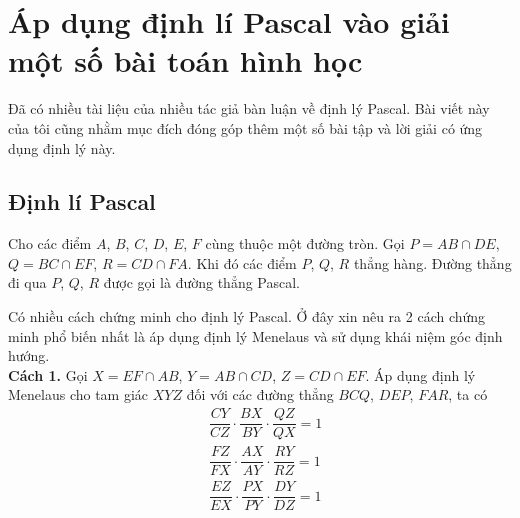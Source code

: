 \section{Áp dụng định lí Pascal vào giải một số bài toán hình học}
\begin{center}
	\textbf{\color{violet}{Ngô Lan Hương - Trường THPT Chuyên Thái Nguyên}}
\end{center}
\noindent Đã có nhiều tài liệu của nhiều tác giả bàn luận về định lý Pascal. Bài viết này của tôi cũng nhằm mục đích đóng góp thêm một số bài tập và lời giải có ứng dụng định lý này.  

\subsection{Định lí Pascal}	

\begin{dl}
Cho các điểm $A$, $B$, $C$, $D$, $E$, $F$ cùng thuộc một đường tròn. Gọi $P=AB\cap DE$, $Q=BC\cap EF$, $R=CD\cap FA$. Khi đó các điểm $P$, $Q$, $R$ thẳng hàng.
Đường thẳng đi qua $P$, $Q$, $R$ được gọi là đường thẳng Pascal.
\end{dl}
Có nhiều cách chứng minh cho định lý Pascal. Ở đây xin nêu ra 2 cách chứng minh phổ biến nhất là áp dụng định lý Menelaus và sử dụng khái niệm góc định hướng.\\
{\bf Cách 1.} Gọi $X=EF\cap AB$, $Y=AB\cap CD$, $Z=CD\cap EF$.
Áp dụng định lý Menelaus cho tam giác $XYZ$ đối với các đường thẳng $BCQ$, $DEP$, $FAR$, ta có
\begin{align*}
&\dfrac{CY}{CZ}\cdot\dfrac{BX}{BY}\cdot\dfrac{QZ}{QX}=1 \tag*{(1)}\\
&\dfrac{FZ}{FX}\cdot \dfrac{AX}{AY}\cdot \dfrac{RY}{RZ}=1 \tag*{(2)}\\
&\dfrac{EZ}{EX}\cdot \dfrac{PX}{PY}\cdot \dfrac{DY}{DZ}=1 \tag*{(3)}\\
\end{align*}
\begin{center}
\end{center}

